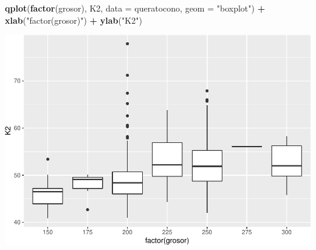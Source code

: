 \documentclass[
]{article}
\newenvironment{Shaded}{\begin{snugshade}}{\end{snugshade}}
\newcommand{\DataTypeTok}[1]{\textcolor[rgb]{0.13,0.29,0.53}{#1}}
\newcommand{\KeywordTok}[1]{\textcolor[rgb]{0.13,0.29,0.53}{\textbf{#1}}}
\newcommand{\NormalTok}[1]{#1}
\newcommand{\OperatorTok}[1]{\textcolor[rgb]{0.81,0.36,0.00}{\textbf{#1}}}
\newcommand{\StringTok}[1]{\textcolor[rgb]{0.31,0.60,0.02}{#1}}
\begin{document}
\begin{Shaded}
\begin{Highlighting}[]
\KeywordTok{qplot}\NormalTok{(}\KeywordTok{factor}\NormalTok{(grosor), K2, }\DataTypeTok{data =}\NormalTok{ queratocono, }\DataTypeTok{geom =} \StringTok{"boxplot"}\NormalTok{) }\OperatorTok{+}
\StringTok{  }\KeywordTok{xlab}\NormalTok{(}\StringTok{"factor(grosor)"}\NormalTok{) }\OperatorTok{+}\StringTok{ }\KeywordTok{ylab}\NormalTok{(}\StringTok{"K2"}\NormalTok{)}
\end{Highlighting}
\end{Shaded}

\includegraphics{document_files/figure-latex/unnamed-chunk-7-2.pdf}
\end{document}
